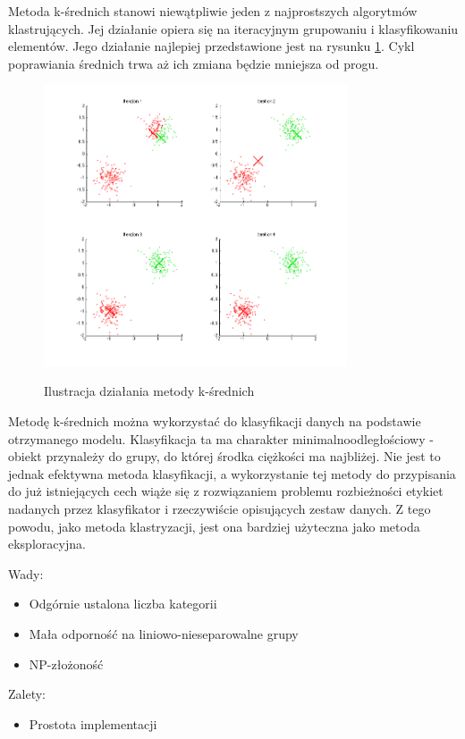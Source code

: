 \documentclass[12pt,a4paper,oneside]{report} %
\begin{document}
Metoda k-średnich stanowi niewątpliwie jeden z najprostszych algorytmów klastrujących. Jej działanie opiera się na iteracyjnym grupowaniu i klasyfikowaniu elementów. Jego działanie najlepiej przedstawione jest na rysunku \ref{kmeans-png}. Cykl poprawiania średnich trwa aż ich zmiana będzie mniejsza od progu.\par

\begin{figure}
\centering
\includegraphics[width=0.8\textwidth]{kmeans.png}
\label{kmeans-png}
\caption{Ilustracja działania metody k-średnich}
\end{figure}

Metodę k-średnich można wykorzystać do klasyfikacji danych na podstawie otrzymanego modelu. Klasyfikacja ta ma charakter minimalnoodległościowy - obiekt przynależy do grupy, do której środka ciężkości ma najbliżej. Nie jest to jednak efektywna metoda klasyfikacji, a wykorzystanie tej metody do przypisania do już istniejących cech wiąże się z rozwiązaniem problemu rozbieżności etykiet nadanych przez klasyfikator i rzeczywiście opisujących zestaw danych. Z tego powodu, jako metoda klastryzacji, jest ona bardziej użyteczna jako metoda eksploracyjna. \par

Wady:\par
\begin{itemize}
\item Odgórnie ustalona liczba kategorii
\item Mała odporność na liniowo-nieseparowalne grupy
\item NP-złożoność
\end{itemize}
Zalety:\par
\begin{itemize}
\item Prostota implementacji
\end{itemize}
\end{document}
